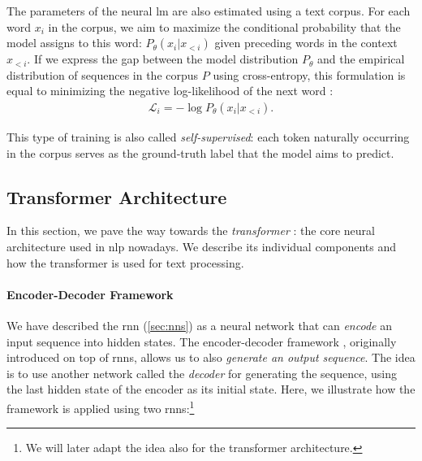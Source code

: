 {The parameters of the neural \ac{lm} are also estimated using a text corpus. For each word $x_i$ in the corpus, we aim to maximize the conditional probability that the model assigns to this word: $P_\theta(x_i|x_{<i})$ given preceding words in the context $x_{<i}$. If we express the gap between the model distribution $P_\theta$ and the empirical distribution of sequences in the corpus $P$ using cross-entropy, this formulation is equal to minimizing the negative log-likelihood of the next word \cite[p.158]{jurafsky2024}:
\begin{align}
    \mathcal{L}_{i} = - \log P_\theta(x_i|x_{<i}). \label{eq:clm}
\end{align}

This type of training is also called \emph{self-supervised}: each token naturally occurring in the corpus serves as the ground-truth label that the model aims to predict.


\subsection{Transformer Architecture}
\label{sec:transformer}
In this section, we pave the way towards the \emph{transformer} \cite{vaswani2017attention}: the core neural architecture used in \ac{nlp} nowadays. We describe its individual components and how the transformer is used for text processing.

\paragraph{Encoder-Decoder Framework}
We have described the \ac{rnn} (\autoref{sec:nns}) as a neural network that can \emph{encode} an input sequence into hidden states. The encoder-decoder framework \cite{sutskever2014sequence,cho2014learning}, originally introduced on top of \acp{rnn}, allows us to also \emph{generate an output sequence}. The idea is to use another network called the \emph{decoder} for generating the sequence, using the last hidden state of the encoder as its initial state. Here, we illustrate how the framework is applied using two \acp{rnn}:\footnote{We will later adapt the idea also for the transformer architecture.}

}

